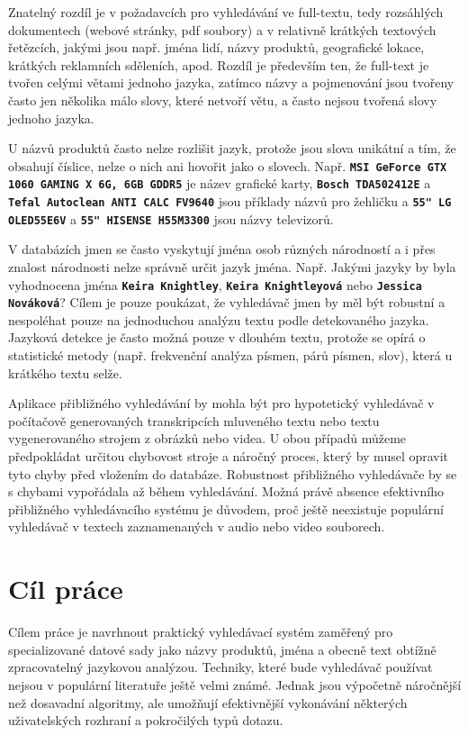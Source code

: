 \documentclass[11pt,letterpaper,oneside,openright]{book}
\newcommand{\bftt}[1]{\texttt{\textbf{#1}}}
\begin{document}
Znatelný rozdíl je v požadavcích pro vyhledávání ve full-textu, tedy rozsáhlých
dokumentech (webové stránky, pdf soubory) a v relativně krátkých textových
řetězcích, jakými jsou např. jména lidí, názvy produktů, geografické lokace,
krátkých reklamních sděleních, apod. Rozdíl je především ten, že full-text je
tvořen celými větami jednoho jazyka, zatímco názvy a pojmenování jsou tvořeny
často jen několika málo slovy, které netvoří větu, a často nejsou tvořená slovy
jednoho jazyka. 

U názvů produktů často nelze rozlišit jazyk, protože jsou slova unikátní a tím,
že obsahují číslice, nelze o nich ani hovořit jako o slovech. Např. \bftt{MSI
GeForce GTX 1060 GAMING X 6G, 6GB GDDR5} je název grafické karty, \bftt{Bosch
TDA502412E} a \bftt{Tefal Autoclean ANTI CALC FV9640} jsou příklady názvů pro
žehličku a \bftt{55" LG OLED55E6V} a \bftt{55" HISENSE H55M3300} jsou názvy
televizorů. 

V databázích jmen se často vyskytují jména osob různých národností a i přes
znalost národnosti nelze správně určit jazyk jména. Např. Jakými jazyky by byla
vyhodnocena jména \bftt{Keira Knightley}, \bftt{Keira Knightleyová} nebo
\bftt{Jessica Nováková}? Cílem je pouze poukázat, že vyhledávač jmen by měl být
robustní a nespoléhat pouze na jednoduchou analýzu textu podle detekovaného
jazyka. Jazyková detekce je často možná pouze v dlouhém textu, protože se opírá
o statistické metody (např. frekvenční analýza písmen, párů písmen, slov),
která u krátkého textu selže.

Aplikace přibližného vyhledávání by mohla být pro hypotetický vyhledávač v
počítačově generovaných transkripcích mluveného textu nebo textu vygenerovaného
strojem z obrázků nebo videa. U obou případů můžeme předpokládat určitou
chybovost stroje a náročný proces, který by musel opravit tyto chyby před
vložením do databáze. Robustnost přibližného vyhledávače by se s chybami
vypořádala až během vyhledávání. Možná právě absence efektivního přibližného
vyhledávacího systému je důvodem, proč ještě neexistuje populární vyhledávač v
textech zaznamenaných v audio nebo video souborech.



\section{Cíl práce}
Cílem práce je navrhnout praktický vyhledávací systém zaměřený pro
specializované datové sady jako názvy produktů, jména a obecně text obtížně
zpracovatelný jazykovou analýzou. Techniky, které bude vyhledávač používat
nejsou v populární literatuře ještě velmi známé. Jednak jsou výpočetně
náročnější než dosavadní algoritmy, ale umožňují efektivnější vykonávání
některých uživatelských rozhraní a pokročilých typů dotazu.
\end{document}

